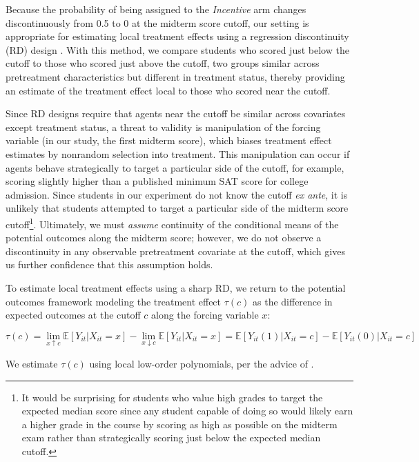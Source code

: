 \documentclass[12pt]{article}
\begin{document}
Because the probability of being assigned to the \textit{Incentive} arm changes discontinuously from 0.5 to 0 at the midterm score cutoff, our setting is appropriate for estimating local treatment effects using a regression discontinuity (RD) design \citep{tc1960, ap2008, il2008}. With this method, we compare students who scored just below the cutoff to those who scored just above the cutoff, two groups similar across pretreatment characteristics but different in treatment status, thereby providing an estimate of the treatment effect local to those who scored near the cutoff.

Since RD designs require that agents near the cutoff be similar across covariates except treatment status, a threat to validity is manipulation of the forcing variable (in our study, the first midterm score), which biases treatment effect estimates by nonrandom selection into treatment. This manipulation can occur if agents behave strategically to target a particular side of the cutoff, for example, scoring slightly higher than a published minimum SAT score for college admission. Since students in our experiment do not know the cutoff \textit{ex ante}, it is unlikely that students attempted to target a particular side of the midterm score cutoff\footnote{It would be surprising for students who value high grades to target the expected median score since any student capable of doing so would likely earn a higher grade in the course by scoring as high as possible on the midterm exam rather than strategically scoring just below the expected median cutoff.}. Ultimately, we must \textit{assume} continuity of the conditional means of the potential outcomes along the midterm score; however, we do not observe a discontinuity in any observable pretreatment covariate at the cutoff, which gives us further confidence that this assumption holds.

To estimate local treatment effects using a sharp RD, we return to the potential outcomes framework modeling the treatment effect $\tau(c)$ as the difference in expected outcomes at the cutoff $c$ along the forcing variable $x$:

\begin{equation} \label{rd_po}
	\tau(c) = \lim_{x \uparrow c} \mathbb{E}[Y_{it} | X_{it} = x] - \lim_{x \downarrow c} \mathbb{E}[Y_{it} | X_{it} = x] = \mathbb{E}[Y_{it}(1) | X_{it} = c] - \mathbb{E}[Y_{it}(0) | X_{it} = c]
\end{equation}

We estimate $\tau(c)$ using local low-order polynomials, per the advice of \textcite{gi2019}.
\end{document}
